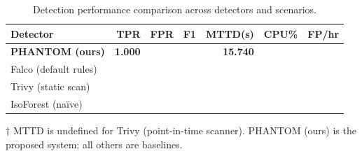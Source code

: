 \begin{table}[h]
\centering
\caption{Detection performance comparison across detectors and scenarios.}
\label{tab:detection_performance}
\begin{tabular}{lrrrrrr}
\hline
Detector & TPR & FPR & F1 & MTTD(s) & CPU\% & FP/hr \\
\hline
\textbf{PHANTOM (ours)} & \textbf{1.000} & \text{---} & \text{---} & \textbf{15.740} & \text{---} & \text{---} \\
Falco (default rules) & \text{---} & \text{---} & \text{---} & \text{---} & \text{---} & \text{---} \\
Trivy (static scan) & \text{---} & \text{---} & \text{---} & \text{---} & \text{---} & \text{---} \\
IsoForest (na\"{i}ve) & \text{---} & \text{---} & \text{---} & \text{---} & \text{---} & \text{---} \\
\hline
\end{tabular}
\vspace{0.5em}
\footnotesize{$\dagger$ MTTD is undefined for Trivy (point-in-time scanner). PHANTOM (ours) is the proposed system; all others are baselines.}
\end{table}